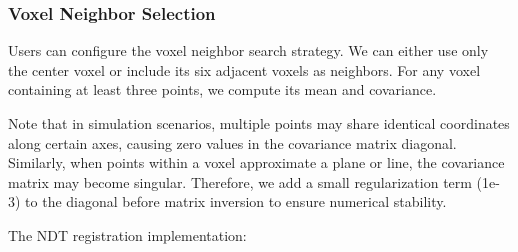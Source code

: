 \subsubsection{Voxel Neighbor Selection}
Users can configure the voxel neighbor search strategy. We can either use only the center voxel or include its six adjacent voxels as neighbors. For any voxel containing at least three points, we compute its mean and covariance. 

Note that in simulation scenarios, multiple points may share identical coordinates along certain axes, causing zero values in the covariance matrix diagonal. Similarly, when points within a voxel approximate a plane or line, the covariance matrix may become singular. Therefore, we add a small regularization term (1e-3) to the diagonal before matrix inversion to ensure numerical stability.

The NDT registration implementation:

